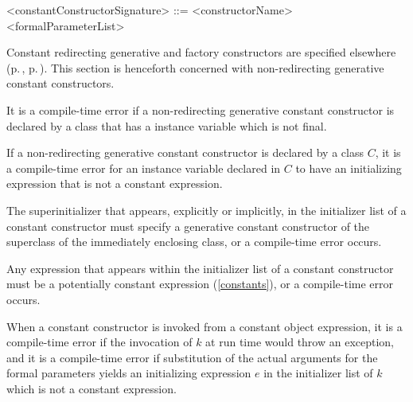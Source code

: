 \documentclass[makeidx]{article}
\begin{document}
\begin{grammar}
<constantConstructorSignature> ::= \gnewline{}
  \CONST{} <constructorName> <formalParameterList>
\end{grammar}


\LMHash{}%
Constant redirecting generative and factory constructors are specified elsewhere
(p.\,\pageref{redirectingGenerativeConstructors},
p.\,\pageref{redirectingFactoryConstructors}).
This section is henceforth concerned with
non-redirecting generative constant constructors.

\LMHash{}%
It is a compile-time error if a non-redirecting generative constant constructor
is declared by a class that has a instance variable which is not final.


\LMHash{}%
If a non-redirecting generative constant constructor 
is declared by a class $C$,
it is a compile-time error
for an instance variable declared in $C$
to have an initializing expression that is not a constant expression.


\LMHash{}%
The superinitializer that appears, explicitly or implicitly,
in the initializer list of a constant constructor
must specify a generative constant constructor of
the superclass of the immediately enclosing class,
or a compile-time error occurs.

\LMHash{}%
Any expression that appears within
the initializer list of a constant constructor
must be a potentially constant expression
(\ref{constants}),
or a compile-time error occurs.

\LMHash{}%
When a constant constructor  is invoked from
a constant object expression,
it is a compile-time error if
the invocation of $k$ at run time would throw an exception,
and it is a compile-time error if
substitution of the actual arguments for the formal parameters
yields an initializing expression $e$ in the initializer list of $k$
which is not a constant expression.
\end{document}
